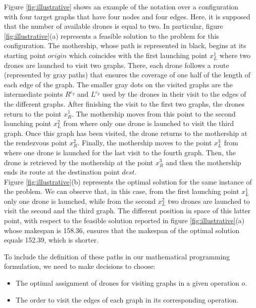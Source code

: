 \documentclass[10pt,a4paper]{elsarticle}
\newcommand{\EN}[1]{{\color{black}#1}}
\begin{document}
\noindent
Figure \ref{fig:illustrative} shows an example of the notation over a configuration with four target graphs that have four nodes and four edges. Here, it is supposed that the number of available drones is equal to two.  
In particular, figure \ref{fig:illustrative}(a) represents a feasible solution \EN{to} the problem for this configuration.
The mothership, whose path is represented in black, begins at its starting point $origin$ which coincides with the first launching point $x_L^1$ where two drones are launched to visit two graphs. There, each drone follows a route (represented by gray paths) that ensures the coverage of one half of the length of each edge of the graph. The smaller gray dots on the visited graphs are the intermediate points $R^{e_g}$ and $L^{e_g}$ used by the drones in their visit to the edges of the different graphs. After finishing the visit \EN{to} the first two graphs, the drones return to the point $x_R^1$. The mothership moves from this point to the second launching point $x_L^2$ from where only one drone is launched to visit the third graph. Once this graph \EN{has been} visited, the drone returns to the mothership at the rendezvous point $x_R^2$. Finally, the mothership moves to the point $x_L^3$ from where one drone is launched for the last visit to the fourth graph. Then, the drone is retrieved by the mothership at the point $x_R^3$ and then the mothership ends its route at the destination point $dest$.\\
Figure \ref{fig:illustrative}(b) represents the optimal solution for the same instance of the problem. We can observe that, in this case, from the first launching point $x_L^1$ only one drone is launched, while from the second $x_L^2$ two drones are launched to visit the second and the third graph. The different position in space of this latter point, with respect to the feasible solution reported in figure \ref{fig:illustrative}(a) whose makespan is 158.36, ensures that the makespan of the optimal solution equals 152.39, which is shorter.



\noindent
To include the definition of these paths in our mathematical programming formulation, we need to make decisions to choose:
\begin{itemize}
\item The optimal assignment of drones for visiting graphs in a given operation $o$.
\item The order to visit the edges of each graph in its corresponding operation.
\end{itemize}
\end{document}
